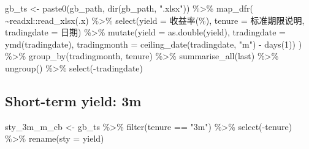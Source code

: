 \documentclass[
]{article}
\newenvironment{Shaded}{\begin{snugshade}}{\end{snugshade}}
\newcommand{\AttributeTok}[1]{\textcolor[rgb]{0.77,0.63,0.00}{#1}}
\newcommand{\DecValTok}[1]{\textcolor[rgb]{0.00,0.00,0.81}{#1}}
\newcommand{\FunctionTok}[1]{\textcolor[rgb]{0.00,0.00,0.00}{#1}}
\newcommand{\NormalTok}[1]{#1}
\newcommand{\OtherTok}[1]{\textcolor[rgb]{0.56,0.35,0.01}{#1}}
\newcommand{\SpecialCharTok}[1]{\textcolor[rgb]{0.00,0.00,0.00}{#1}}
\newcommand{\StringTok}[1]{\textcolor[rgb]{0.31,0.60,0.02}{#1}}
\begin{document}
\begin{Shaded}
\begin{Highlighting}[]
\NormalTok{gb\_ts }\OtherTok{\textless{}{-}} \FunctionTok{paste0}\NormalTok{(gb\_path, }\FunctionTok{dir}\NormalTok{(gb\_path, }\StringTok{".xlsx"}\NormalTok{)) }\SpecialCharTok{\%\textgreater{}\%} 
  \FunctionTok{map\_dfr}\NormalTok{(}
    \SpecialCharTok{\textasciitilde{}}\NormalTok{readxl}\SpecialCharTok{::}\FunctionTok{read\_xlsx}\NormalTok{(.x) }\SpecialCharTok{\%\textgreater{}\%} 
      \FunctionTok{select}\NormalTok{(}\AttributeTok{yield =} \StringTok{\textasciigrave{}}\AttributeTok{收益率(\%)}\StringTok{\textasciigrave{}}\NormalTok{, }\AttributeTok{tenure =} \StringTok{\textasciigrave{}}\AttributeTok{标准期限说明}\StringTok{\textasciigrave{}}\NormalTok{, }\AttributeTok{tradingdate =} \StringTok{\textasciigrave{}}\AttributeTok{日期}\StringTok{\textasciigrave{}}\NormalTok{) }\SpecialCharTok{\%\textgreater{}\%} 
      \FunctionTok{mutate}\NormalTok{(}\AttributeTok{yield =} \FunctionTok{as.double}\NormalTok{(yield), }\AttributeTok{tradingdate =} \FunctionTok{ymd}\NormalTok{(tradingdate), }\AttributeTok{tradingmonth =} \FunctionTok{ceiling\_date}\NormalTok{(tradingdate, }\StringTok{"m"}\NormalTok{) }\SpecialCharTok{{-}} \FunctionTok{days}\NormalTok{(}\DecValTok{1}\NormalTok{))}
\NormalTok{  ) }\SpecialCharTok{\%\textgreater{}\%} 
  \FunctionTok{group\_by}\NormalTok{(tradingmonth, tenure) }\SpecialCharTok{\%\textgreater{}\%} 
  \FunctionTok{summarise\_all}\NormalTok{(last) }\SpecialCharTok{\%\textgreater{}\%} 
  \FunctionTok{ungroup}\NormalTok{() }\SpecialCharTok{\%\textgreater{}\%} 
  \FunctionTok{select}\NormalTok{(}\SpecialCharTok{{-}}\NormalTok{tradingdate)}
\end{Highlighting}
\end{Shaded}

\hypertarget{short-term-yield-3m}{%
\subsection{Short-term yield: 3m}\label{short-term-yield-3m}}

\begin{Shaded}
\begin{Highlighting}[]
\NormalTok{sty\_3m\_m\_cb }\OtherTok{\textless{}{-}}\NormalTok{ gb\_ts }\SpecialCharTok{\%\textgreater{}\%} 
  \FunctionTok{filter}\NormalTok{(tenure }\SpecialCharTok{==} \StringTok{"3m"}\NormalTok{) }\SpecialCharTok{\%\textgreater{}\%} 
  \FunctionTok{select}\NormalTok{(}\SpecialCharTok{{-}}\NormalTok{tenure) }\SpecialCharTok{\%\textgreater{}\%} 
  \FunctionTok{rename}\NormalTok{(}\AttributeTok{sty =}\NormalTok{ yield)}
\end{Highlighting}
\end{Shaded}
\end{document}
